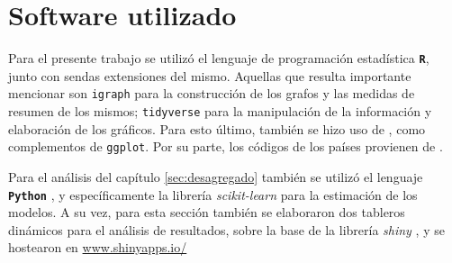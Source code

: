 \documentclass[class=article, crop=false]{standalone}
\begin{document}
\section{Software utilizado}

Para el presente trabajo se utilizó el lenguaje de programación estadística \texttt{\textbf{R}}\citep{RCoreTeam2017}, junto con sendas extensiones del mismo. Aquellas que resulta importante mencionar son \texttt{igraph}\citep{Csardi2006} para la construcción de los grafos y las medidas de resumen de los mismos; \texttt{tidyverse}\citep{Wickham2017} para la manipulación de la información y elaboración de los gráficos. Para esto último, también se hizo uso de  \citep{Wilke2017,Arnold2017,Neuwirth2014,Slowikowski2017,Vu2011}, como complementos de \texttt{ggplot}. Por su parte, los códigos de los países provienen de \citep{Arel-Bundock2017}.

Para el análisis del capítulo \ref{sec:desagregado} también se utilizó el lenguaje \texttt{\textbf{Python}} \citep{CS-R9526}, y específicamente la librería \textit{scikit-learn} \citep{scikit-learn} para la estimación de los modelos.
A su vez, para esta sección también se elaboraron dos tableros dinámicos para el análisis de resultados, sobre la base de la librería \textit{shiny} \citep{Chang2018}, y se hostearon en \url{www.shinyapps.io/} \citep{Allaire2019}


%
%
%
\end{document}
